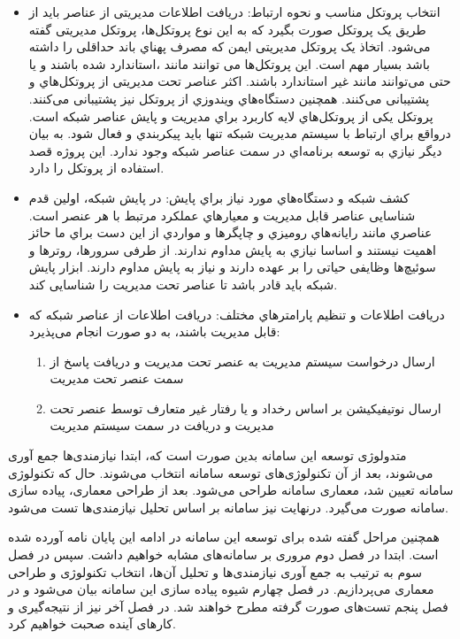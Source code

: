 \begin{itemize}
    \item انتخاب پروتکل مناسب و نحوه ارتباط: دریافت اطلاعات مدیریتی از عناصر باید از طریق یک پروتکل صورت بگیرد که به این نوع پروتکل‌ها، پروتکل مدیریتی گفته می‌شود. اتخاذ یک پروتکل مدیریتی ایمن که مصرف پهناي باند حداقلی را داشته باشد بسیار مهم است. این پروتکل‌ها می توانند مانند ،استاندارد شده باشند و یا حتی می‌توانند مانند  غیر استاندارد باشند. اکثر عناصر تحت مدیریتی از پروتکل‌هاي  و   پشتیبانی می‌کنند. همچنین دستگاه‌هاي ویندوزي از پروتکل  نیز پشتیبانی می‌کنند. پروتکل  یکی از پروتکل‌هاي لایه کاربرد  براي مدیریت و پایش عناصر شبکه است. درواقع براي ارتباط با سیستم مدیریت شبکه تنها باید پیکربندي و فعال شود. به بیان دیگر نیازي به توسعه برنامه‌اي در سمت عناصر شبکه وجود ندارد. این پروژه قصد استفاده از پروتکل  را دارد.
\newpage
    \item کشف شبکه و دستگاه‌هاي مورد نیاز براي پایش: در پایش شبکه، اولین قدم شناسایی عناصر قابل مدیریت و معیارهاي عملکرد مرتبط با هر عنصر است. عناصري مانند رایانه‌هاي رومیزي و چاپگرها و مواردي از این دست براي ما حائز اهمیت نیستند و اساسا نیازي به پایش مداوم ندارند. از طرفی سرورها، روترها و سوئیچ‌ها وظایفی حیاتی را بر عهده دارند و نیاز به پایش مداوم دارند. ابزار پایش شبکه باید قادر باشد تا عناصر تحت مدیریت را شناسایی کند.
    \item دریافت اطلاعات و تنظیم پارامترهاي مختلف: دریافت اطلاعات از عناصر شبکه که قابل مدیریت باشند، به دو صورت انجام می‌پذیرد:
    \begin{enumerate}
        \item ارسال درخواست سیستم مدیریت به عنصر تحت مدیریت و دریافت پاسخ از سمت عنصر تحت مدیریت
        \item ارسال نوتیفیکیشن بر اساس رخداد و یا رفتار غیر متعارف توسط عنصر تحت مدیریت و دریافت در سمت سیستم مدیریت
    \end{enumerate}
\end{itemize}


متدولوژی توسعه این سامانه بدین صورت است که، ابتدا نیازمندی‌ها جمع آوری می‌شوند، بعد از آن تکنولوژی‌های توسعه سامانه انتخاب می‌شوند. حال که تکنولوژی سامانه تعیین شد، معماری سامانه طراحی می‌شود. بعد از طراحی معماری، پیاده سازی سامانه صورت می‌گیرد. درنهایت نیز سامانه بر اساس تحلیل نیازمندی‌ها تست می‌شود. 

همچنین مراحل گفته شده برای توسعه این سامانه در ادامه این پایان نامه آورده شده است. ابتدا در فصل دوم مروری بر سامانه‌های مشابه خواهیم داشت. سپس در فصل سوم به ترتیب به جمع آوری نیازمندی‌ها و تحلیل آن‌ها، انتخاب تکنولوژی و طراحی معماری می‌پردازیم. در فصل چهارم شیوه پیاده سازی این سامانه بیان می‌شود و در فصل پنجم تست‌های صورت گرفته مطرح خواهند شد. در فصل آخر نیز از نتیجه‌گیری و کارهای آینده صحبت خواهیم کرد.

